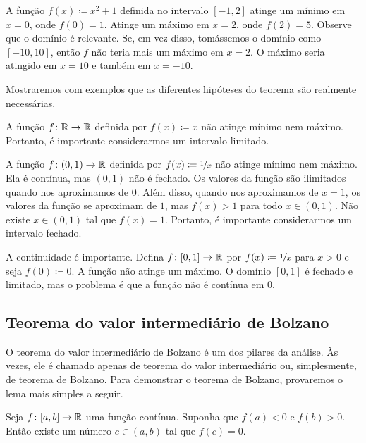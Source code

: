 \begin{example}
A função $f(x) \coloneqq x^2+1$ definida no intervalo $[-1,2]$ atinge um mínimo
em $x=0$, onde $f(0) = 1$. Atinge um máximo em $x=2$, onde $f(2) = 5$.
Observe que o domínio é relevante. Se, em vez disso, tomássemos o domínio
como $[-10,10]$, então $f$ não teria mais um máximo em $x=2$.
O máximo seria atingido em $x=10$ e também em $x=-10$.
\end{example}

Mostraremos com exemplos que as diferentes hipóteses do teorema são
realmente necessárias.

\begin{example}
A função $f \colon {\mathbb{R}} \to {\mathbb{R}}$ definida por $f(x) \coloneqq x$
não atinge mínimo nem máximo. Portanto, é importante
considerarmos um intervalo limitado.
\end{example}

\begin{example}
A função $f \colon (0,1) \to {\mathbb{R}}$ definida por $f(x) \coloneqq \nicefrac{1}{x}$
não atinge mínimo nem máximo.
Ela é contínua, mas $(0,1)$ não é fechado.
Os valores da função são
ilimitados quando nos aproximamos de $0$. Além disso, quando nos aproximamos de $x=1$, os valores da
função se aproximam de $1$, mas $f(x) > 1$ para todo $x \in (0,1)$. Não existe
$x \in (0,1)$ tal que $f(x) = 1$. Portanto, é importante
considerarmos um intervalo fechado.
\end{example}

\begin{example}
A continuidade é importante.
Defina $f \colon [0,1] \to {\mathbb{R}}$ por
$f(x) \coloneqq \nicefrac{1}{x}$ para $x > 0$ e seja $f(0) \coloneqq 0$.
A função não atinge um máximo. O domínio $[0,1]$ é fechado e
limitado, mas o problema é que
a função não é contínua em 0.
\end{example}

\subsection{Teorema do valor intermediário de Bolzano}

O teorema do valor intermediário de Bolzano é um dos pilares da análise.
Às vezes, ele é chamado apenas de teorema do valor intermediário ou,
simplesmente, de teorema de Bolzano. Para demonstrar o teorema de Bolzano,
provaremos o lema mais simples a seguir.

\begin{lemma} \label{IVT:lemma}
Seja $f \colon [a,b] \to {\mathbb{R}}$ uma função contínua.
Suponha que $f(a) < 0$ e $f(b) > 0$.
Então existe um número $c \in (a,b)$ tal que $f(c) = 0$.
\end{lemma}

